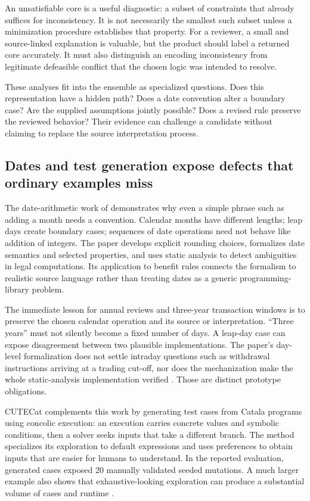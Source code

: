 An unsatisfiable core is a useful diagnostic: a subset of constraints that
already suffices for inconsistency. It is not necessarily the smallest such
subset unless a minimization procedure establishes that property. For a
reviewer, a small and source-linked explanation is valuable, but the product
should label a returned core accurately. It must also distinguish an
encoding inconsistency from legitimate defeasible conflict that the chosen
logic was intended to resolve.

These analyses fit into the ensemble as specialized questions. Does this
representation have a hidden path? Does a date convention alter a boundary
case? Are the supplied assumptions jointly possible? Does a revised rule
preserve the reviewed behavior? Their evidence can challenge a candidate
without claiming to replace the source interpretation process.

\subsection{Dates and test generation expose defects that ordinary examples miss}
\label{merge:P-02-literature:03}


The date-arithmetic work of \citet{dates2024} demonstrates why even a simple phrase
such as adding a month needs a convention. Calendar months have different
lengths; leap days create boundary cases; sequences of date operations need not
behave like addition of integers. The paper develops explicit rounding choices,
formalizes date semantics and selected properties, and uses static analysis to
detect ambiguities in legal computations. Its application to benefit rules
connects the formalism to realistic source language rather than treating dates
as a generic programming-library problem.

The immediate lesson for annual reviews and three-year transaction windows is
to preserve the chosen calendar operation and its source or interpretation.
``Three years'' must not silently become a fixed number of days. A leap-day case
can expose disagreement between two plausible implementations. The paper's
day-level formalization does not settle intraday questions such as withdrawal
instructions arriving at a trading cut-off, nor does the mechanization make the
whole static-analysis implementation verified
\citep[secs.~2--6]{dates2024}. Those are distinct prototype obligations.


CUTECat complements this work by generating test cases from Catala programs using
concolic execution: an execution carries concrete values and symbolic conditions,
then a solver seeks inputs that take a different branch. The method specializes
its exploration to default expressions and uses preferences to obtain inputs
that are easier for humans to understand. In the reported evaluation, generated
cases exposed 20 manually validated seeded mutations. A much larger example also
shows that exhaustive-looking exploration can produce a substantial volume of
cases and runtime \citep[secs.~3--5]{cutecat2025}.


